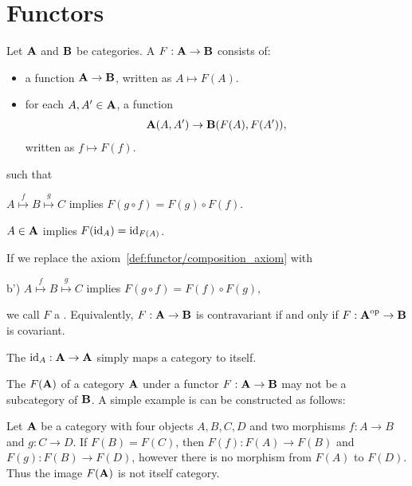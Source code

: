 \section{Functors}\label{sec:functors}

\begin{definition}\label{def:functor}\cite[definitions 1.2.1, 1.2.10]{Leinster2014}
  Let $\operatorname{\mathbf{A}}$ and $\operatorname{\mathbf{B}}$ be categories. A  $F: \operatorname{\mathbf{A}} \to \operatorname{\mathbf{B}}$ consists of:
  \begin{itemize}
    \item a function $\operatorname{\mathbf{A}} \to \operatorname{\mathbf{B}}$, written as $A \mapsto F(A)$.
    \item for each $A, A' \in \operatorname{\mathbf{A}}$, a function
    \begin{align*}
      \operatorname{\mathbf{A}}(A, A') \to \operatorname{\mathbf{B}}(F(A), F(A')),
    \end{align*}
    written as $f \mapsto F(f)$.
  \end{itemize}
  such that
  \begin{defenum}
    \item\label{def:functor/composition_axiom} $A \overset f \mapsto B \overset g \mapsto C$ implies $F(g \circ f) = F(g) \circ F(f)$.
    \item\label{def:functor/identity_axiom} $A \in \operatorname{\mathbf{A}}$ implies $F(\operatorname{id}_A) = \operatorname{id}_{F(A)}$.
  \end{defenum}

  If we replace the axiom~\cref{def:functor/composition_axiom} with
  \begin{defenum}
    \item[b')]\label{def:functor/contravariant_composition_axiom} $A \overset f \mapsto B \overset g \mapsto C$ implies $F(g \circ f) = F(f) \circ F(g)$,
  \end{defenum}
  we call $F$ a . Equivalently, $F: \operatorname{\mathbf{A}} \to \operatorname{\mathbf{B}}$ is contravariant if and only if $F: \operatorname{\mathbf{A}}^{\operatorname{op}} \to \operatorname{\mathbf{B}}$ is covariant.

  The  $\operatorname{id}_A: \operatorname{\mathbf{A}} \to \operatorname{\mathbf{A}}$ simply maps a category to itself.
\end{definition}

\begin{note}\label{note:image_of_functor_maybe_not_subcategory}
  The  $F(\operatorname{\mathbf{A}})$ of a category $\operatorname{\mathbf{A}}$ under a functor $F: \operatorname{\mathbf{A}} \to \operatorname{\mathbf{B}}$ may not be a subcategory of $\operatorname{\mathbf{B}}$. A simple example is can be constructed as follows:

  Let $\operatorname{\mathbf{A}}$ be a category with four objects $A, B, C, D$ and two morphisms $f: A \to B$ and $g: C \to D$. If $F(B) = F(C)$, then $F(f): F(A) \to F(B)$ and $F(g): F(B) \to F(D)$, however there is no morphism from $F(A)$ to $F(D)$. Thus the image $F(\operatorname{\mathbf{A}})$ is not itself category.
\end{note}

